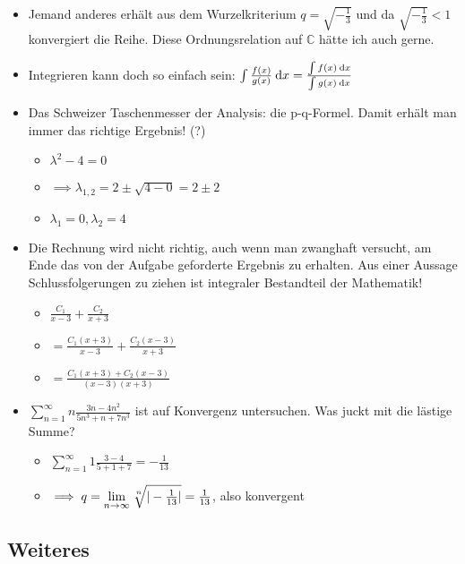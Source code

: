 \begin{itemize}
	\item Jemand anderes erhält aus dem Wurzelkriterium $q=\sqrt{-\frac{1}{3}}$ und da $\sqrt{-\frac{1}{3}} < 1$ konvergiert die Reihe. Diese Ordnungsrelation auf $\mathbb{C}$ hätte ich auch gerne.
	\item Integrieren kann doch so einfach sein: $\int\frac{f(x)}{g(x)} \:\mathrm{d}{x} =\frac{\int f(x)\:\mathrm{d}{x}}{\int g(x)\:\mathrm{d}{x}} $
	\item Das Schweizer Taschenmesser der Analysis: die p-q-Formel. Damit erhält man immer das richtige Ergebnis! (?)
	\begin{itemize}
		\item $\lambda^2-4=0$
		\item $\implies \lambda_{1,2} = 2 \pm \sqrt{4 - 0} = 2 \pm 2$
		\item $\lambda_1 = 0, \lambda_2 = 4$
	\end{itemize}
	\item Die Rechnung wird nicht richtig, auch wenn man zwanghaft versucht, am Ende das von der Aufgabe geforderte Ergebnis zu erhalten. Aus einer Aussage Schlussfolgerungen zu ziehen ist integraler Bestandteil der Mathematik!
	\begin{itemize}
		\item $\frac{C_1}{x-3} + \frac{C_2}{x+3}$
		\item $= \frac{C_1(x+3)}{x-3} + \frac{C_2(x-3)}{x+3}$
		\item $= \frac{C_1(x+3)+C_2(x-3)}{(x-3)(x+3)}$
	\end{itemize}
	\item $\sum\limits_{n=1}^{\infty} n \frac{3n-4n^2}{5n^3+n+7n^3}$ ist auf Konvergenz untersuchen. Was juckt mit die lästige Summe?
	\begin{itemize}
		\item $\sum\limits_{n=1}^{\infty} 1 \frac{3-4}{5+1+7} = -\frac{1}{13}$
		\item $\implies q=\lim\limits_{n \to\infty} \nroot{n}{|-\frac{1}{13}|} = \frac{1}{13}$, also konvergent
	\end{itemize}
\end{itemize}

\subsection* {Weiteres}

